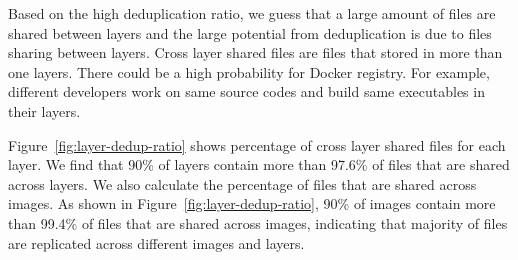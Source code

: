 Based on the high deduplication ratio, we guess that a large amount of files are shared between layers and the large potential from deduplication is due to files sharing between layers. Cross layer shared files are files that stored in more than one layers. There could be a high probability for Docker registry. For example, different developers work on same source codes and build same executables in their layers. 


Figure~\ref{fig:layer-dedup-ratio} shows percentage of cross layer
shared files for each layer. We find that 90\% of layers contain more than 97.6\%
of files that are shared across layers. We also calculate the percentage of
files that are shared across images. As shown in
Figure~\ref{fig:layer-dedup-ratio}, 90\% of images contain more than 99.4\% of
files that are shared across images, indicating that majority of files are
replicated across different images and layers.
